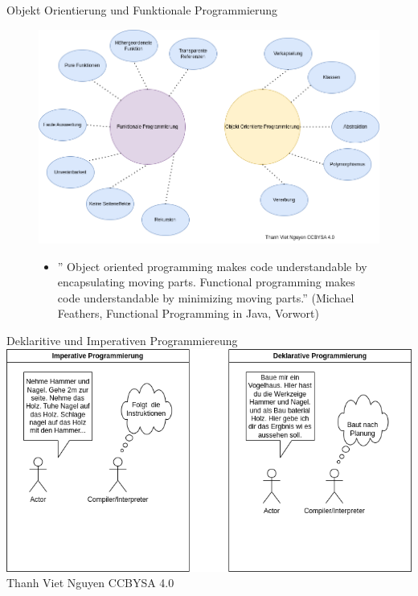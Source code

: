 \documentclass{beamer}
\begin{document}
\begin{frame}{Objekt Orientierung und Funktionale Programmierung}
\begin{figure}
    \centering
    \includegraphics[scale=0.38]{bilder/Unterschiede.drawio.png}
\end{figure}
\end{frame}

\begin{frame}
\begin{figure}
    \begin{itemize}
    \item \textmd{'' Object oriented programming makes code understandable by encapsulating moving parts.
Functional programming makes code understandable by minimizing moving parts.'' (Michael Feathers, Functional Programming in Java, Vorwort)}
    \end{itemize}
\end{figure}
\end{frame}

\begin{frame}{Deklaritive und Imperativen Programmiereung}
\centering
\includegraphics[scale=0.38]{bilder/ProgrammierParadigmen.drawio.png} 
\\
\textmd{\tiny Thanh Viet Nguyen CCBYSA 4.0}
\end{frame}
\end{document}
